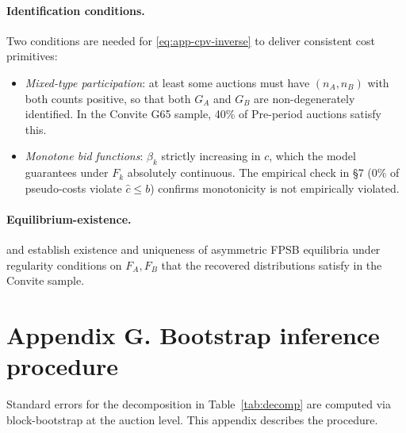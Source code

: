 \documentclass[12pt]{article}
\begin{document}
\paragraph{Identification conditions.}
Two conditions are needed for \eqref{eq:app-cpv-inverse} to
deliver consistent cost primitives:
\begin{itemize}
\item[(i)] \emph{Mixed-type participation}: at least some
auctions must have $(n_A, n_B)$ with both counts positive, so
that both $G_A$ and $G_B$ are non-degenerately identified. In the
Convite G65 sample, 40\% of Pre-period auctions satisfy this.
\item[(ii)] \emph{Monotone bid functions}: $\beta_k$ strictly
increasing in $c$, which the model guarantees under
$F_k$ absolutely continuous. The empirical check in §7
(0\% of pseudo-costs violate $\hat c \leq b$) confirms monotonicity
is not empirically violated.
\end{itemize}

\paragraph{Equilibrium-existence.}
\citet{lebrun1999} and \citet{maskinriley2000} establish
existence and uniqueness of asymmetric FPSB equilibria under
regularity conditions on $F_A, F_B$ that the recovered
distributions satisfy in the Convite sample.

\section*{Appendix G. Bootstrap inference procedure}
\label{app:bootstrap}

Standard errors for the decomposition in
Table~\ref{tab:decomp} are computed via block-bootstrap at the
auction level. This appendix describes the procedure.
\end{document}
